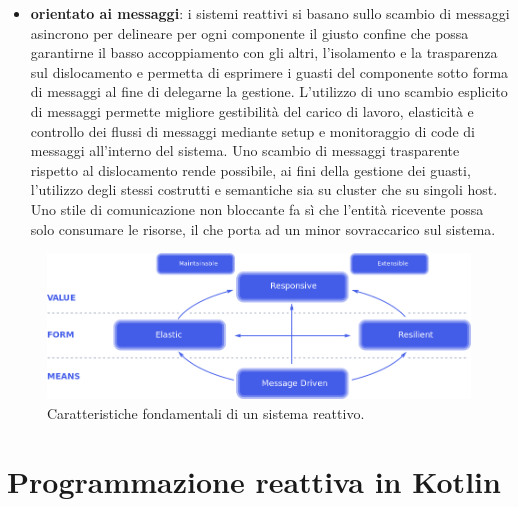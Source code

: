 \documentclass[12pt,a4paper,openright,twoside]{book}
\begin{document}
\begin{itemize}
    \item \textbf{orientato ai messaggi}: i sistemi reattivi si basano sullo scambio di messaggi asincrono per delineare per ogni componente il giusto confine che possa garantirne il basso accoppiamento con gli altri, l'isolamento e la trasparenza sul dislocamento e permetta di esprimere i guasti del componente sotto forma di messaggi al fine di delegarne la gestione. L'utilizzo di uno scambio esplicito di messaggi permette migliore gestibilità del carico di lavoro, elasticità e controllo dei flussi di messaggi mediante setup e monitoraggio di code di messaggi all'interno del sistema. Uno scambio di messaggi trasparente rispetto al dislocamento rende possibile, ai fini della gestione dei guasti, l'utilizzo degli stessi costrutti e semantiche sia su cluster che su singoli host. Uno stile di comunicazione non bloccante fa sì che l'entità ricevente possa solo consumare le risorse, il che porta ad un minor sovraccarico sul sistema.
\end{itemize}

\begin{figure}
    \centering
    \includegraphics[width=.80\linewidth]{figures/reactive-programming/reactive-manifesto.png}
    \caption{Caratteristiche fondamentali di un sistema reattivo.}
    \label{fig:rp-reactive-manifesto}
\end{figure}


\chapter{Programmazione reattiva in Kotlin}
\end{document}
